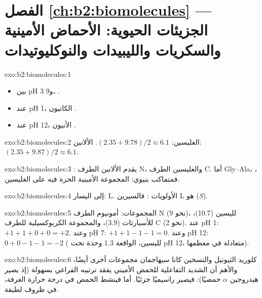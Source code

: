 \section*{الفصل \ref{ch:b2:biomolecules} --- الجزيئات الحيوية: الأحماض الأمينية والسكريات والليبيدات والنوكليوتيدات}

\begin{solution}{exo:b2:biomolecules:1}
\begin{itemize}
  \item بين pH 3 و9،  .
  \item عند pH 1، الكاتيون .
  \item عند pH 12، الأنيون .
\end{itemize}
\end{solution}

\begin{solution}{exo:b2:biomolecules:2}
الغليسين: $(2.35 + 9.78)/2 \approx 6.1$. الألانين: $(2.35 + 9.87)/2 \approx 6.1$.
\end{solution}

\begin{solution}{exo:b2:biomolecules:3}
: يقدم الألانين الطرف N، والغليسين الطرف C. أما Gly--Ala،
، فمتماكب بنيوي: المجموعة الأمينية الحرة فيه على الغليسين.
\end{solution}

\begin{solution}{exo:b2:biomolecules:4}
 إلى اليسار: L. الأولويات : فالسيرين L
هو (\textit{S}).
\end{solution}

\begin{solution}{exo:b2:biomolecules:5}
المجموعات: أمونيوم الطرف N (نحو 9)،  لليسين (10.7)،  للأسبارتات (3.9)،
والمجموعة الكربوكسيلية للطرف C (نحو 2). عند pH 1: $+1 +1 + 0 + 0 = +2$. وعند pH 7: $+1 +1 -1 -1 = 0$. وعند pH 12:
$0 + 0 - 1 - 1 = -2$ ( لليسين، الواقعة 1.3 وحدة تحت pH 12، متعادلة في معظمها).
\end{solution}

\begin{solution}{exo:b2:biomolecules:6}
كلوريد الثيونيل والتسخين كانا سيهاجمان مجموعات أخرى أيضًا، والأهم أن  الشديد التفاعلية
للحمض الأميني يفقد ترتيبه الفراغي بسهولة (إذ يصير هيدروجين $\alpha$ حمضيًا): فيصير 
راسيميًا جزئيًا. أما  فينشط الحمض في درجة حرارة الغرفة، في ظروف لطيفة.
\end{solution}

